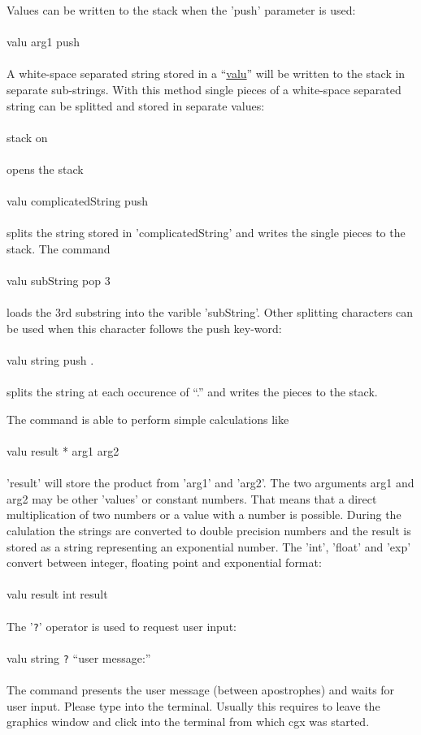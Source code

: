 \documentclass{article}
\providecommand{\htmlref}[2]{\hyperref[#2]{#1}}
\begin{document}
Values can be written to the stack when the 'push' parameter is used:\\\\valu arg1 push\\\\A white-space separated string stored in a ``\htmlref{valu}{valu}'' will be written to the stack in separate sub-strings. With this method single pieces of a white-space separated string can be splitted and stored in separate values:\\\\stack on\\\\opens the stack\\\\valu complicatedString push\\\\splits the string stored in 'complicatedString' and writes the single pieces to the stack. The command \\\\valu subString pop 3\\\\loads the 3rd substring into the varible 'subString'. Other splitting characters can be used when this character follows the push key-word:\\\\valu string push .\\\\splits the string at each occurence of ``.'' and writes the pieces to the stack. 

The command is able to perform simple calculations like\\\\valu result * arg1 arg2\\\\'result' will store the product from 'arg1' and 'arg2'. The two arguments arg1 and arg2 may be other 'values' or constant numbers. That means that a direct multiplication of two numbers or a value with a number is possible. During the calulation the strings are converted to double precision numbers and the result is stored as a string representing an exponential number. The 'int', 'float' and 'exp' convert between integer, floating point and exponential format:\\\\valu result int result\\\\

The '\verb_?_' operator is used to request user input:\\\\valu string \verb_?_ ``user message:''\\\\The command presents the user message (between apostrophes) and waits for user input. Please type into the terminal. Usually this requires to leave the graphics window and click into the terminal from which cgx was started.
\end{document}
